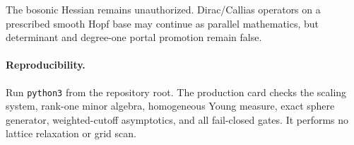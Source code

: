 \documentclass[10pt]{article}
\begin{document}
The bosonic Hessian remains unauthorized.  Dirac/Callias operators on a
prescribed smooth Hopf base may continue as parallel mathematics, but
determinant and degree-one portal promotion remain false.

\paragraph{Reproducibility.}
Run \texttt{python3}
from the repository root.  The production card checks the scaling system,
rank-one minor algebra, homogeneous Young measure, exact sphere generator,
weighted-cutoff asymptotics, and all fail-closed gates.  It performs no
lattice relaxation or grid scan.
\end{document}
